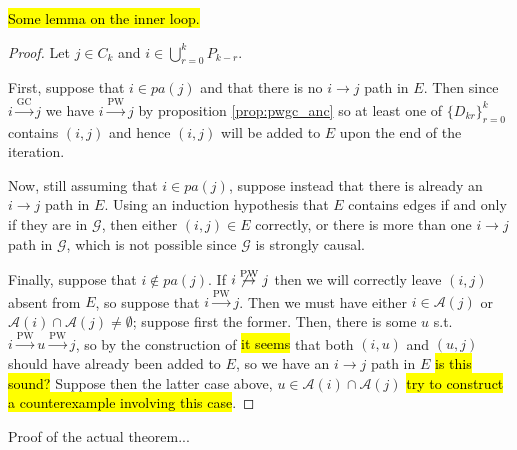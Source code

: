 \documentclass[12pt]{article}
\def\gc{\overset{\text{GC}}{\rightarrow}}  %
\def\pwgc{\overset{\text{PW}}{\rightarrow}}  %
\def\gcg{\mathcal{G}}  %
\newcommand{\pa}[1]{pa(#1)}  %
\newcommand{\anc}[1]{\mathcal{A}(#1)}  %
\begin{document}
\begin{lemma}
  \hl{Some lemma on the inner loop.}
\end{lemma}
\begin{proof}
  Let $j \in C_k$ and $i \in \bigcup_{r = 0}^k P_{k - r}$.

  First, suppose that $i \in \pa{j}$ and that there is no $i \rightarrow j$ path in $E$.  Then since $i \gc j$ we have $i \pwgc j$ by proposition \ref{prop:pwgc_anc} so at least one of $\{D_{kr} \}_{r = 0}^k$ contains $(i, j)$ and hence $(i, j)$ will be added to $E$ upon the end of the iteration.

  Now, still assuming that $i \in \pa{j}$, suppose instead that there is already an $i \rightarrow j$ path in $E$.  Using an induction hypothesis that $E$ contains edges if and only if they are in $\gcg$, then either $(i, j) \in E$ correctly, or there is more than one $i \rightarrow j$ path in $\gcg$, which is not possible since $\gcg$ is strongly causal.

  Finally, suppose that $i \not \in \pa{j}$.  If $i \not \pwgc j$ then we will correctly leave $(i, j)$ absent from $E$, so suppose that $i \pwgc j$.  Then we must have either $i \in \anc{j}$ or $\anc{i} \cap \anc{j} \ne \emptyset$; suppose first the former.  Then, there is some $u$ s.t. $i \pwgc u \pwgc j$, so by the construction of \hl{it seems} that both $(i, u)$ and $(u, j)$ should have already been added to $E$, so we have an $i \rightarrow j$ path in $E$ \hl{is this sound?}  Suppose then the latter case above, $u \in \anc{i} \cap \anc{j}$ \hl{try to construct a counterexample involving this case}.
\end{proof}

Proof of the actual theorem...
\end{document}
